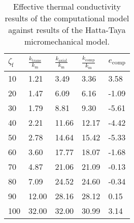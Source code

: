 \begin{table}[!h]
\centering
\caption{Effective thermal conductivity results of the computational model against results of the Hatta-Taya micromechanical model.}\label{table:ddf3_validation}
\small
\begin{tabular}{*{4}{P{0.07\textwidth}}P{0.1\textwidth}}
\toprule
  $\zeta_{\text{f}}$ \bfs{(\%)}
& {$\frac{k_\text{trans}}{k_\text{m}}$} 
& {$\frac{k_\text{axial}}{k_\text{m}}$} 
& {$\frac{k_\text{comp}}{k_\text{m}}$} 
& $e_\text{comp}$ \bfs{(\%)}
\\
\toprule
10 &1.21  &3.49 & 3.36 &  3.58\\
20 &1.47  &6.09 & 6.16 & -1.09\\
30 &1.79  &8.81 & 9.30 & -5.61\\
40 &2.21  &11.66& 12.17& -4.42\\
50 &2.78  &14.64& 15.42& -5.33\\
60 &3.60  &17.77& 18.07& -1.68\\
70 &4.87  &21.06& 21.09& -0.13\\
80 &7.09  &24.52& 24.60& -0.34\\
90 &12.00 &28.16& 28.12&  0.15\\
100&32.00 &32.00& 30.99&  3.14\\
 \bottomrule
\end{tabular}
\end{table}	

